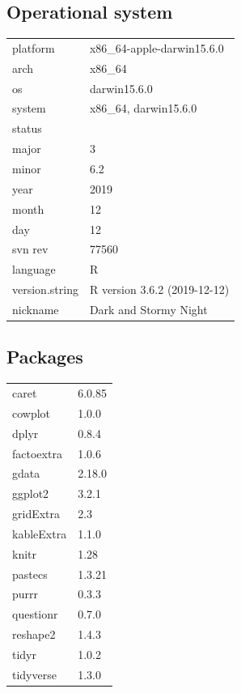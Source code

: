 \documentclass[
]{article}
\begin{document}
\hypertarget{operational-system}{%
\subsection{Operational system}\label{operational-system}}

\begin{table}[H]
\centering
\begin{tabular}{ll}
\toprule
platform & x86\_64-apple-darwin15.6.0\\
arch & x86\_64\\
os & darwin15.6.0\\
system & x86\_64, darwin15.6.0\\
status & \\
\addlinespace
major & 3\\
minor & 6.2\\
year & 2019\\
month & 12\\
day & 12\\
\addlinespace
svn rev & 77560\\
language & R\\
version.string & R version 3.6.2 (2019-12-12)\\
nickname & Dark and Stormy Night\\
\bottomrule
\end{tabular}
\end{table}

\hypertarget{packages}{%
\subsection{Packages}\label{packages}}

\begin{table}[H]
\centering
\begin{tabular}{ll}
\toprule
caret & 6.0.85\\
cowplot & 1.0.0\\
dplyr & 0.8.4\\
factoextra & 1.0.6\\
gdata & 2.18.0\\
\addlinespace
ggplot2 & 3.2.1\\
gridExtra & 2.3\\
kableExtra & 1.1.0\\
knitr & 1.28\\
pastecs & 1.3.21\\
\addlinespace
purrr & 0.3.3\\
questionr & 0.7.0\\
reshape2 & 1.4.3\\
tidyr & 1.0.2\\
tidyverse & 1.3.0\\
\bottomrule
\end{tabular}
\end{table}
\newpage
\end{document}
